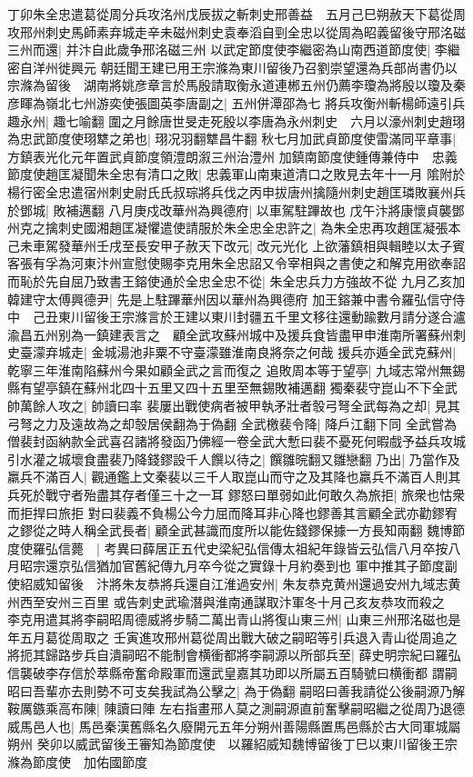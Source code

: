 丁卯朱全忠遣葛從周分兵攻洺州戊辰拔之斬刺史邢善益　五月己巳朔赦天下葛從周攻邢州刺史馬師素弃城走辛未磁州刺史袁奉滔自剄全忠以從周為昭義留後守邢洺磁三州而還|{
	并汴自此歲争邢洺磁三州}
以武定節度使李繼密為山南西道節度使|{
	李繼密自洋州徙興元}
朝廷聞王建已用王宗滌為東川留後乃召劉崇望還為兵部尚書仍以宗滌為留後　湖南將姚彦章言於馬殷請取衡永道連郴五州仍薦李瓊為將殷以瓊及秦彦睴為嶺北七州游奕使張圖英李唐副之|{
	五州併潭邵為七}
將兵攻衡州斬楊師遠引兵趣永州|{
	趣七喻翻}
圍之月餘唐世旻走死殷以李唐為永州刺史　六月以濠州刺史趙珝為忠武節度使珝犨之弟也|{
	珝况羽翻犨昌牛翻}
秋七月加武貞節度使雷滿同平章事|{
	方鎮表光化元年置武貞節度領澧朗溆三州治澧州}
加鎮南節度使鍾傳兼侍中　忠義節度使趙匡凝聞朱全忠有清口之敗|{
	忠義軍山南東道清口之敗見去年十一月}
隂附於楊行密全忠遣宿州刺史尉氏氏叔琮將兵伐之丙申拔唐州擒隨州刺史趙匡璘敗襄州兵於鄧城|{
	敗補邁翻}
八月庚戍改華州為興德府|{
	以車駕駐蹕故也}
戊午汴將康懷貞襲鄧州克之擒刺史國湘趙匡凝懼遣使請服於朱全忠全忠許之|{
	為朱全忠再攻趙匡凝張本}
己未車駕發華州壬戌至長安甲子赦天下改元|{
	改元光化}
上欲藩鎮相與輯睦以太子賓客張有孚為河東汴州宣慰使賜李克用朱全忠詔又令宰相與之書使之和解克用欲奉詔而恥於先自屈乃致書王鎔使通於全忠全忠不從|{
	朱全忠兵力方強故不從}
九月乙亥加韓建守太傅興德尹|{
	先是上駐蹕華州因以華州為興德府}
加王鎔兼中書令羅弘信守侍中　己丑東川留後王宗滌言於王建以東川封疆五千里文移往還動踰數月請分遂合瀘渝昌五州别為一鎮建表言之　顧全武攻蘇州城中及援兵食皆盡甲申淮南所署蘇州刺史臺濛弃城走|{
	金城湯池非粟不守臺濛雖淮南良將奈之何哉}
援兵亦遁全武克蘇州|{
	乾寧三年淮南陷蘇州今果如顧全武之言而復之}
追敗周本等于望亭|{
	九域志常州無錫縣有望亭鎮在蘇州北四十五里又四十五里至無錫敗補邁翻}
獨秦裴守崑山不下全武帥萬餘人攻之|{
	帥讀曰率}
裴屢出戰使病者被甲執矛壯者彀弓弩全武每為之却|{
	見其弓弩之力及遠故為之却彀居侯翻為于偽翻}
全武檄裴令降|{
	降戶江翻下同}
全武嘗為僧裴封函納款全武喜召諸將發函乃佛經一卷全武大慙曰裴不憂死何暇戲予益兵攻城引水灌之城壞食盡裴乃降錢鏐設千人饌以待之|{
	饌雛晥翻又雛戀翻}
乃出|{
	乃當作及}
羸兵不滿百人|{
	觀通鑑上文秦裴以三千人取崑山而守之及其降也羸兵不滿百人則其兵死於戰守者殆盡其存者僅三十之一耳}
鏐怒曰單弱如此何敢久為旅拒|{
	旅衆也怙衆而拒捍曰旅拒}
對曰裴義不負楊公今力屈而降耳非心降也鏐善其言顧全武亦勸鏐宥之鏐從之時人稱全武長者|{
	顧全武甚識而度所以能佐錢鏐保據一方長知兩翻}
魏博節度使羅弘信薨　|{
	考異曰薛居正五代史梁紀弘信傳太祖紀年錄皆云弘信八月卒按八月昭宗還京弘信猶加官舊紀傳九月卒今從之實錄十月約奏到也}
軍中推其子節度副使紹威知留後　汴將朱友恭將兵還自江淮過安州|{
	朱友恭克黄州還過安州九域志黄州西至安州三百里}
或告刺史武瑜潛與淮南通謀取汴軍冬十月己亥友恭攻而殺之　李克用遣其將李嗣昭周德威將步騎二萬出青山將復山東三州|{
	山東三州邢洺磁也是年五月葛從周取之}
壬寅進攻邢州葛從周出戰大破之嗣昭等引兵退入青山從周追之將扼其歸路步兵自潰嗣昭不能制會横衝都將李嗣源以所部兵至|{
	薛史明宗紀曰羅弘信襲破李存信於萃縣帝奮命殿軍而還武皇嘉其功即以所屬五百騎號曰横衝都}
謂嗣昭曰吾輩亦去則勢不可支矣我試為公擊之|{
	為于偽翻}
嗣昭曰善我請從公後嗣源乃解鞍厲鏃乘高布陳|{
	陳讀曰陣}
左右指畫邢人莫之測嗣源直前奮擊嗣昭繼之從周乃退德威馬邑人也|{
	馬邑秦漢舊縣名久廢開元五年分朔州善陽縣置馬邑縣於古大同軍城屬朔州}
癸卯以威武留後王審知為節度使　以羅紹威知魏博留後丁巳以東川留後王宗滌為節度使　加佑國節度


